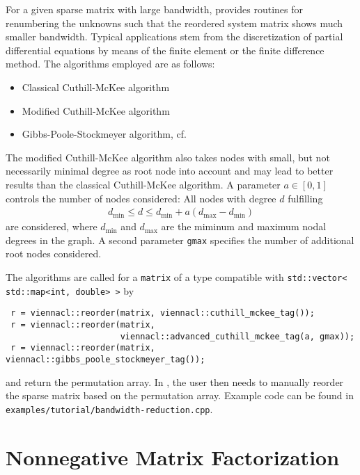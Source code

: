 For a given sparse matrix with large bandwidth, {\ViennaCL} provides routines for renumbering the unknowns such that the reordered system matrix shows much
smaller bandwidth. Typical applications stem from the discretization of partial differential equations by means of the finite element or the finite difference
method. The algorithms employed are as follows:
\begin{itemize}
 \item Classical Cuthill-McKee algorithm \cite{cuthill:reducing-bandwidth}
 \item Modified Cuthill-McKee algorithm \cite{cuthill:reducing-bandwidth}
 \item Gibbs-Poole-Stockmeyer algorithm, cf.~\cite{lewis:gps-algorithm}
\end{itemize}
The modified Cuthill-McKee algorithm also takes nodes with small, but not necessarily minimal degree as root node into account and may lead to better results
than the classical Cuthill-McKee algorithm. A parameter $a \in [0,1]$ controls the number of nodes considered: All nodes with degree $d$ fulfilling
\begin{align*}
 d_{\min} \leq d \leq d_{\min} + a(d_{\max} - d_{\min})
\end{align*}
are considered, where $d_{\min}$ and $d_{\max}$ are the miminum and maximum nodal degrees in the graph. A second parameter \lstinline|gmax| specifies the
number of additional root nodes considered.

The algorithms are called for a \lstinline|matrix| of a type compatible with \lstinline|std::vector< std::map<int, double> >| by
\begin{lstlisting}
 r = viennacl::reorder(matrix, viennacl::cuthill_mckee_tag());
 r = viennacl::reorder(matrix, 
                       viennacl::advanced_cuthill_mckee_tag(a, gmax));
 r = viennacl::reorder(matrix, viennacl::gibbs_poole_stockmeyer_tag());
\end{lstlisting}
and return the permutation array. In {\ViennaCLversion}, the user then needs to manually reorder the sparse matrix based on the permutation array. Example code
can be found in \lstinline|examples/tutorial/bandwidth-reduction.cpp|.


\section{Nonnegative Matrix Factorization}

